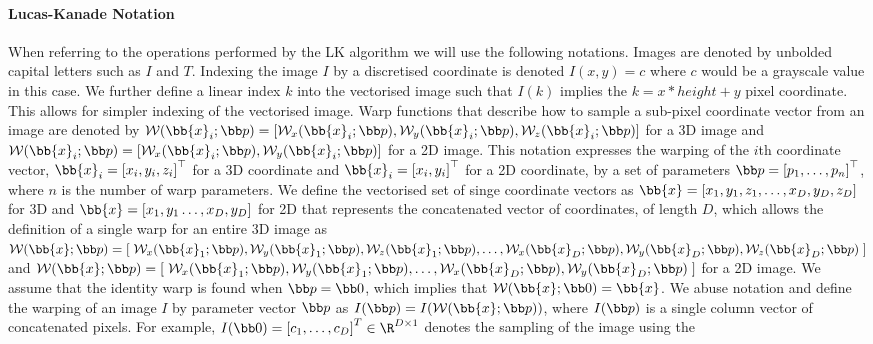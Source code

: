 \paragraph{Lucas-Kanade Notation}\label{subsubsec:lk-notation}
When referring to the operations performed by the LK algorithm we will use the
following notations. Images are denoted by unbolded capital letters such as
$I$ and $T$. Indexing the image $I$ by a discretised coordinate is
denoted $I(x, y) = c$ where $c$ would be a grayscale value in this case. We
further define a linear index $k$ into the vectorised image such that $I(k)$
implies the $k = x * height + y$ pixel coordinate.
This allows for simpler indexing of the vectorised image.
Warp functions that describe how to sample a sub-pixel coordinate
vector from an image are denoted by
$\mathcal{W}(\bb{x}_i;\p) = \left[\mathcal{W}_x(\bb{x}_i;\p), \mathcal{W}_y(\bb{x}_i;\p),\mathcal{W}_z(\bb{x}_i;\p) \right]$ for a 3D image and $\mathcal{W}(\bb{x}_i;\p) = \left[\mathcal{W}_x(\bb{x}_i;\p), \mathcal{W}_y(\bb{x}_i;\p) \right]$ for a 2D image. This notation
expresses the warping of the $i$th coordinate vector,
$\bb{x}_i = {[x_i, y_i, z_i]}^{\top}$ for a 3D coordinate and
$\bb{x}_i = {[x_i, y_i]}^{\top}$ for a 2D coordinate, by a set of parameters
$\p = {\left[p_1, \ldots, p_n\right]}^{\top}$, where $n$ is the number of warp
parameters. We define the vectorised set of singe coordinate vectors as
$\bb{x} = \left[ x_1, y_1, z_1, \ldots, x_D, y_D, z_D \right]$ for 3D and
$\bb{x} = \left[ x_1, y_1 \ldots, x_D, y_D \right]$ for 2D that
represents the concatenated vector of coordinates, of length $D$, which allows
the definition of a single warp for an entire 3D image as
$\mathcal{W}(\bb{x};\p) = \left[\right. \mathcal{W}_x(\bb{x}_1;\p), \mathcal{W}_y(\bb{x}_1;\p), \mathcal{W}_z(\bb{x}_1;\p),\ldots,\mathcal{W}_x(\bb{x}_D;\p), \mathcal{W}_y(\bb{x}_D;\p), \mathcal{W}_z(\bb{x}_D;\p) \left.\right]$ and
$\mathcal{W}(\bb{x};\p) = \left[\right. \mathcal{W}_x(\bb{x}_1;\p), \mathcal{W}_y(\bb{x}_1;\p),\ldots,\mathcal{W}_x(\bb{x}_D;\p), \mathcal{W}_y(\bb{x}_D;\p) \left.\right]$ for a 2D image.
We assume that the identity warp is found when $\p = \zero$, which implies that
$\mathcal{W}(\bb{x};\zero) = \bb{x}$. We abuse notation and define the
warping of an image $I$ by parameter vector $\p$ as $I(\p) = I(\mathcal{W}(\bb{x};\p))$,
where $I(\p)$ is a single column vector of concatenated pixels. For example,
$I(\zero) = {[c_1, \ldots, c_D]}^T \in \R^{D \times 1}$ denotes the
sampling of the image using the
